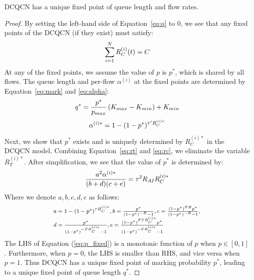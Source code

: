 \begin{thm}
DCQCN has a unique fixed point of queue length and flow rates. 
\end{thm}
\begin{proof}
By setting the left-hand side of Equation~\ref{eq:q} to 0,
we see that any fixed points of the DCQCN (if they exist) must
satisfy:
\begin{equation}
\small
\sum\limits_{i = 1}^N {R_C^{(i)}(t)} = C
\label{eq:fixedrc}
\end{equation}
At any of the fixed points, we assume the value of $p$ is $p^*$, which is shared
by all flows. The queue length and per-flow $\alpha^{(i)}$ at the fixed points
are determined by Equation~\ref{eq:mark} and \ref{eq:alpha}:
\begin{equation}
\small
{q^*} = \frac{{{p^*}}}{{{p_{max}}}}\left( {{K_{max}} - {K_{min}}} \right) + {K_{min}}
\end{equation}
\begin{equation}
\small
\alpha^{(i)*}  = 1 - {(1 - p^*)^{{\tau '}R_C^{(i)*}}}
\end{equation}
Next, we show that $p^*$ exists and is uniquely determined by $R_C^{(i)*}$ in
the DCQCN model. Combining Equation~\ref{eq:rt} and \ref{eq:rc}, 
we eliminate the variable $R_T^{(i)*}$. After simplification, we see that the value 
of $p^*$ is determined by:
\begin{equation}
\small
\frac{{{a^2}\alpha^{(i)*} }}{{(b + d)(c + e)}} = {\tau ^2}{R_{AI}}R_C^{(i)*}
\label{eq:p_fixed}
\end{equation}
Where we denote $a, b, c, d, e$ as follows:
\begin{equation}
\small
\begin{array}{l}
a = 1 - {(1 - p^*)^{\tau {R_C^{(i)*}}}},b = \frac{{p^*}}{{{{(1 - p^*)}^{ - B}} - 1}},c = \frac{{{{(1 - p^*)}^{FB}}p^*}}{{{{(1 - p^*)}^{ - B}} - 1}},\\
d = \frac{{p^*}}{{{{(1 - p^*)}^{ - T{R_C^{(i)*}}}} - 1}},e = \frac{{{{(1 - p^*)}^{FT{R_C^{(i)*}}}}p^*}}{{{{(1 - p^*)}^{ - T{R_C^{(i)*}}}} - 1}}
\end{array}
\end{equation}
The LHS of Equation (\ref{eq:p_fixed}) is a monotonic function of $p$ when $p \in [0,1]$.
Furthermore, when $p = 0$, the LHS is smaller than RHS, and vice versa when $p =
1$. Thus DCQCN has a unique fixed point of marking probability $p^*$, leading to
a unique fixed point of queue length $q^*$.


\end{proof}
